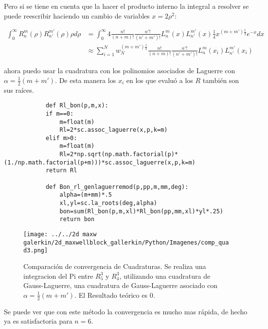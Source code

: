 		Pero si se tiene en cuenta que la hacer el producto interno la integral a resolver se puede reescribir haciendo un cambio de variables $x=2\rho^2$:
		
		\begin{align*}
			 \int_{0}^{\infty}R^{m}_{n}(\rho)R^{m'}_{n'}(\rho)\rho d\rho &=
			 \int_{0}^{\infty} 4\frac{n!}{(n+m)!}\frac{n'!}{(n'+m')!}L^{m}_{n}(x)L^{m'}_{n'}(x)\tfrac{1}{4}x^{(m+m')\tfrac{1}{2}}e^{-x}dx \\
			 & \approx \sum_{i=1}^N w_N^{(m+m')\tfrac{1}{2}}  \frac{n!}{(n+m)!}\frac{n'!}{(n'+m')!}L^{m}_{n}(x_i)L^{m'}_{n'}(x_i) 
		\end{align*}
			
		ahora puedo usar la cuadratura con los polinomios asociados de Laguerre con $\alpha=\tfrac{1}{2}(m+m')$.
		De esta manera los $x_i$ en los que evaluó a los $R$ también son sus raíces.  
		
		\begin{lstlisting}
			def Rl_bon(p,m,x):
			if m==0:
				m=float(m)
				Rl=2*sc.assoc_laguerre(x,p,k=m)
			elif m>0:
				m=float(m)
				Rl=2*np.sqrt(np.math.factorial(p)*(1./np.math.factorial(p+m)))*sc.assoc_laguerre(x,p,k=m) 
			return Rl
			
			def Bon_rl_genlaguerremod(p,pp,m,mm,deg):
				alpha=(m+mm)*.5    
				xl,yl=sc.la_roots(deg,alpha)    
				bon=sum(Rl_bon(p,m,xl)*Rl_bon(pp,mm,xl)*yl*.25)
				return bon
		\end{lstlisting}

		\begin{figure}[h]
			\texttt{[image: ../../2d maxw galerkin/2d\_maxwellblock\_gallerkin/Python/Imagenes/comp\_quad3.png]}
			\caption{Comparación de convergencia de  Cuadraturas. Se realiza una integracion del Pi entre $R_5^3$ y $R_4^3$, utilizando una cuadratura de Gauss-Laguerre, una cuadratura de Gauss-Laguerre asociado con $\alpha =\tfrac{1}{2}(m+m')$. El Resultado teórico es $0$. }
		\end{figure}
		
		Se puede ver que con este método la convergencia es mucho mas rápida, de hecho ya es satisfactoria para $n=6$.
		
